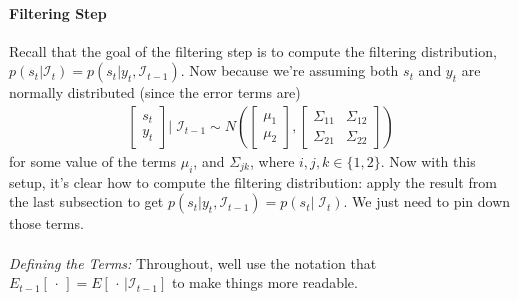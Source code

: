 \documentclass[a4paper,12pt]{article}
\begin{document}
\paragraph{Filtering Step}
Recall that the goal of the filtering step is to compute the
filtering distribution, $p(s_t|\mathcal{I}_{t})=p(s_t|y_t,
\mathcal{I}_{t-1})$. Now because we're assuming both $s_t$ and $y_t$ are
normally distributed (since the error terms are)
\begin{align*}
  \begin{bmatrix} s_t \\ y_t \end{bmatrix} | \; 
  \mathcal{I}_{t-1}
  \sim 
  N\left(\begin{bmatrix} \mu_1 \\ \mu_2 \end{bmatrix},
  \begin{bmatrix} \Sigma_{11} & \Sigma_{12} \\
  \Sigma_{21} & \Sigma_{22} \end{bmatrix} 
  \right)
\end{align*}
for some value of the terms $\mu_{i}$, and $\Sigma_{jk}$, where $i, j,
k\in\{1,2\}$. Now with this setup, it's clear how to compute the
filtering distribution: apply the result from the last subsection to get
$p(s_t|y_t, \mathcal{I}_{t-1}) = p(s_t | \;\mathcal{I}_{t})$. We just
need to pin down those terms.
\\
\\
{\sl Defining the Terms:} \/Throughout, well use the notation that
$E_{t-1}[\,\cdot\,] = E[\,\cdot\,|\mathcal{I}_{t-1}]$ to make things
more readable.
\end{document}
